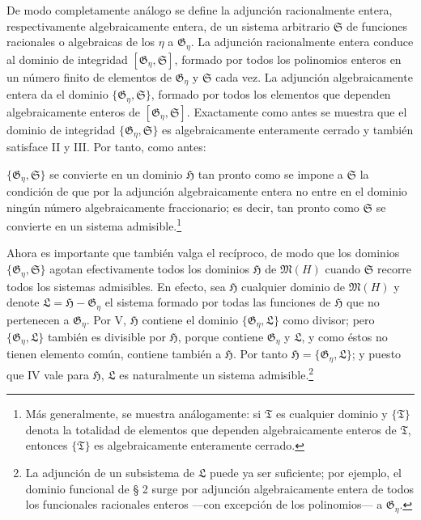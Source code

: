 \documentclass[11pt]{article}
\begin{document}
De modo completamente análogo se define la adjunción racionalmente entera, respectivamente algebraicamente entera, de un sistema arbitrario $\mathfrak S$ de funciones racionales o algebraicas de los $\eta$ a $\mathfrak G_\eta$. La adjunción racionalmente entera conduce al dominio de integridad $[\mathfrak G_\eta,\mathfrak S]$, formado por todos los polinomios enteros en un número finito de elementos de $\mathfrak G_\eta$ y $\mathfrak S$ cada vez. La adjunción algebraicamente entera da el dominio $\{\mathfrak G_\eta,\mathfrak S\}$, formado por todos los elementos que dependen algebraicamente enteros de $[\mathfrak G_\eta,\mathfrak S]$. Exactamente como antes se muestra que el dominio de integridad $\{\mathfrak G_\eta,\mathfrak S\}$ es algebraicamente enteramente cerrado y también satisface II y III. Por tanto, como antes:

$\{\mathfrak G_\eta,\mathfrak S\}$ se convierte en un dominio $\mathfrak H$ tan pronto como se impone a $\mathfrak S$ la condición de que por la adjunción algebraicamente entera no entre en el dominio ningún número algebraicamente fraccionario; es decir, tan pronto como $\mathfrak S$ se convierte en un sistema admisible.\footnote{Más generalmente, se muestra análogamente: si $\mathfrak T$ es cualquier dominio y $\{\mathfrak T\}$ denota la totalidad de elementos que dependen algebraicamente enteros de $\mathfrak T$, entonces $\{\mathfrak T\}$ es algebraicamente enteramente cerrado.}

Ahora es importante que también valga el recíproco, de modo que los dominios $\{\mathfrak G_\eta,\mathfrak S\}$ agotan efectivamente todos los dominios $\mathfrak H$ de $\mathfrak M(H)$ cuando $\mathfrak S$ recorre todos los sistemas admisibles. En efecto, sea $\mathfrak H$ cualquier dominio de $\mathfrak M(H)$ y denote $\mathfrak L=\mathfrak H-\mathfrak G_\eta$ el sistema formado por todas las funciones de $\mathfrak H$ que no pertenecen a $\mathfrak G_\eta$. Por V, $\mathfrak H$ contiene el dominio $\{\mathfrak G_\eta,\mathfrak L\}$ como divisor; pero $\{\mathfrak G_\eta,\mathfrak L\}$ también es divisible por $\mathfrak H$, porque contiene $\mathfrak G_\eta$ y $\mathfrak L$, y como éstos no tienen elemento común, contiene también a $\mathfrak H$. Por tanto $\mathfrak H=\{\mathfrak G_\eta,\mathfrak L\}$; y puesto que IV vale para $\mathfrak H$, $\mathfrak L$ es naturalmente un sistema admisible.\footnote{La adjunción de un subsistema de $\mathfrak L$ puede ya ser suficiente; por ejemplo, el dominio funcional de § 2 surge por adjunción algebraicamente entera de todos los funcionales racionales enteros ---con excepción de los polinomios--- a $\mathfrak G_\eta$.}
\end{document}
